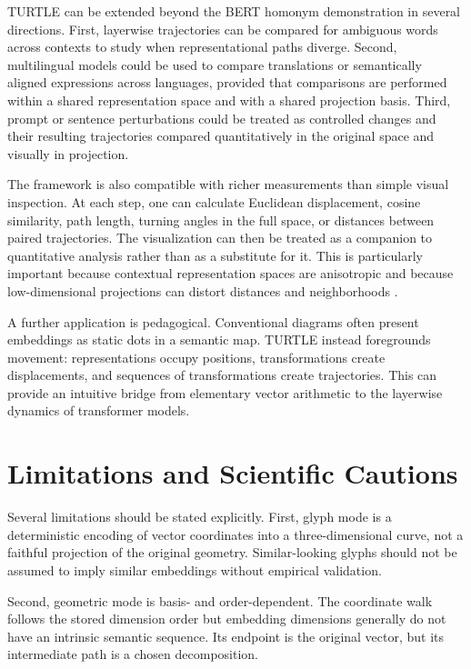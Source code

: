 \documentclass[manuscript,screen,nonacm]{acmart}
\begin{document}
TURTLE can be extended beyond the BERT homonym demonstration in several directions. First, layerwise trajectories can be compared for ambiguous words across contexts to study when representational paths diverge. Second, multilingual models could be used to compare translations or semantically aligned expressions across languages, provided that comparisons are performed within a shared representation space and with a shared projection basis. Third, prompt or sentence perturbations could be treated as controlled changes and their resulting trajectories compared quantitatively in the original space and visually in projection.

The framework is also compatible with richer measurements than simple visual inspection. At each step, one can calculate Euclidean displacement, cosine similarity, path length, turning angles in the full space, or distances between paired trajectories. The visualization can then be treated as a companion to quantitative analysis rather than as a substitute for it. This is particularly important because contextual representation spaces are anisotropic and because low-dimensional projections can distort distances and neighborhoods \citep{ethayarajh}.

A further application is pedagogical. Conventional diagrams often present embeddings as static dots in a semantic map. TURTLE instead foregrounds movement: representations occupy positions, transformations create displacements, and sequences of transformations create trajectories. This can provide an intuitive bridge from elementary vector arithmetic to the layerwise dynamics of transformer models.

\section{Limitations and Scientific Cautions}\label{limitations-and-scientific-cautions}

Several limitations should be stated explicitly. First, glyph mode is a deterministic encoding of vector coordinates into a three-dimensional curve, not a faithful projection of the original geometry. Similar-looking glyphs should not be assumed to imply similar embeddings without empirical validation.

Second, geometric mode is basis- and order-dependent. The coordinate walk follows the stored dimension order but embedding dimensions generally do not have an intrinsic semantic sequence. Its endpoint is the original vector, but its intermediate path is a chosen decomposition.
\end{document}
